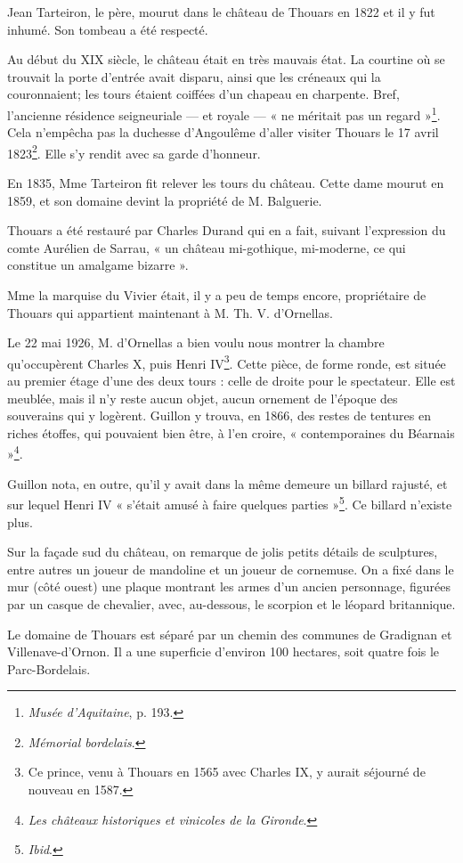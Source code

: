 Jean Tarteiron, le père, mourut dans le château de Thouars en 1822 et il y fut inhumé. Son tombeau a été respecté.

Au début du XIX\ieme{} siècle, le château était en très mauvais état. La courtine où se trouvait la porte d'entrée avait disparu, ainsi que les créneaux qui la couronnaient; les tours étaient coiffées d'un chapeau en charpente. Bref, l'ancienne résidence seigneuriale — et royale — « ne méritait pas un regard »\footnote{\textit{Musée d'Aquitaine}, p. 193.}. Cela n'empêcha pas la duchesse d'Angoulême d'aller visiter Thouars le 17 avril 1823\footnote{\textit{Mémorial bordelais}.}. Elle s'y rendit avec sa garde d'honneur.

En 1835, Mme Tarteiron fit relever les tours du château. Cette dame mourut en 1859, et son domaine devint la propriété de M. Balguerie.

Thouars a été restauré par Charles Durand qui en a fait, suivant l'expression du comte Aurélien de Sarrau, « un château mi-gothique, mi-moderne, ce qui constitue un amalgame bizarre ».

Mme la marquise du Vivier était, il y a peu de temps encore, propriétaire de Thouars qui appartient maintenant à M. Th. V. d'Ornellas.

Le 22 mai 1926, M. d'Ornellas a bien voulu nous montrer la chambre qu'occupèrent Charles X, puis Henri IV\footnote{Ce prince, venu à Thouars en 1565 avec Charles IX, y aurait séjourné de nouveau en 1587.}. Cette pièce, de forme ronde, est située au premier étage d'une des deux tours : celle de droite pour le spectateur. Elle est meublée, mais il n'y reste aucun objet, aucun ornement de l'époque des souverains qui y logèrent. Guillon y trouva, en 1866, des restes de tentures en riches étoffes, qui pouvaient bien être, à l'en croire, « contemporaines du Béarnais »\footnote{\textit{Les châteaux historiques et vinicoles de la Gironde}.}.

Guillon nota, en outre, qu'il y avait dans la même demeure un billard rajusté, et sur lequel Henri IV « s'était amusé à faire quelques parties »\footnote{\textit{Ibid}.}. Ce billard n'existe plus.

Sur la façade sud du château, on remarque de jolis petits détails de sculptures, entre autres un joueur de mandoline et un joueur de cornemuse. On a fixé dans le mur (côté ouest) une plaque montrant les armes d'un ancien personnage, figurées par un casque de chevalier, avec, au-dessous, le scorpion et le léopard britannique.

Le domaine de Thouars est séparé par un chemin des communes de Gradignan et Villenave-d'Ornon. Il a une superficie d'environ 100 hectares, soit quatre fois le Parc-Bordelais.

